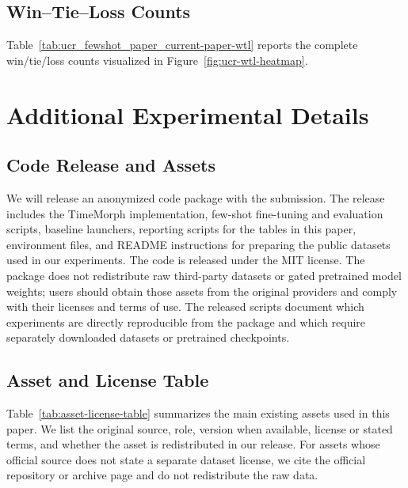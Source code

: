 \documentclass[10pt,journal,compsoc]{IEEEtran}
\begin{document}
\clearpage
\onecolumn
\appendices


\clearpage

\clearpage

\clearpage


\clearpage

\subsection{Win--Tie--Loss Counts}
\label{app:wtl-table}
Table~\ref{tab:ucr_fewshot_paper_current-paper-wtl} reports the complete win/tie/loss counts visualized in Figure~\ref{fig:ucr-wtl-heatmap}.



\clearpage

\section{Additional Experimental Details}
\label{app:details}

\subsection{Code Release and Assets}
\label{app:code-and-assets}

We will release an anonymized code package with the submission. The release includes the TimeMorph implementation, few-shot fine-tuning and evaluation scripts, baseline launchers, reporting scripts for the tables in this paper, environment files, and README instructions for preparing the public datasets used in our experiments. The code is released under the MIT license. The package does not redistribute raw third-party datasets or gated pretrained model weights; users should obtain those assets from the original providers and comply with their licenses and terms of use. The released scripts document which experiments are directly reproducible from the package and which require separately downloaded datasets or pretrained checkpoints.

\subsection{Asset and License Table}
\label{app:asset-license-table}

Table~\ref{tab:asset-license-table} summarizes the main existing assets used in this paper. We list the original source, role, version when available, license or stated terms, and whether the asset is redistributed in our release. For assets whose official source does not state a separate dataset license, we cite the official repository or archive page and do not redistribute the raw data.
\end{document}
